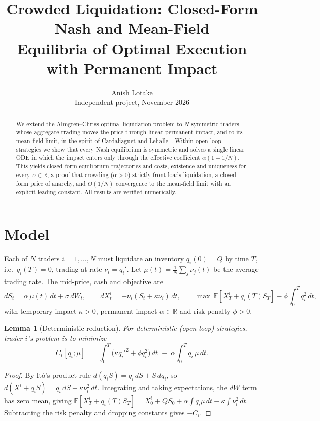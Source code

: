 \documentclass[11pt]{article}
\title{Crowded Liquidation: Closed-Form Nash and Mean-Field\\
Equilibria of Optimal Execution with Permanent Impact}
\author{Anish Lotake\\ \small Independent project, November 2026}
\date{}
\newtheorem{lemma}{Lemma}
\theoremstyle{definition}
\theoremstyle{remark}
\newcommand{\R}{\mathbb{R}}
\newcommand{\E}{\mathbb{E}}
\begin{document}
\maketitle

\begin{abstract}
We extend the Almgren--Chriss optimal liquidation problem to $N$ symmetric traders whose
aggregate trading moves the price through linear permanent impact, and to its mean-field
limit, in the spirit of Cardaliaguet and Lehalle~\cite{CL}. Within open-loop strategies we
show that every Nash equilibrium is symmetric and solves a single linear ODE in which the
impact enters only through the effective coefficient $\alpha(1-1/N)$. This yields closed-form
equilibrium trajectories and costs, existence and uniqueness for every $\alpha\in\R$, a proof
that crowding ($\alpha>0$) strictly front-loads liquidation, a closed-form price of anarchy,
and $O(1/N)$ convergence to the mean-field limit with an explicit leading constant. All
results are verified numerically.
\end{abstract}

\section{Model}
Each of $N$ traders $i=1,\dots,N$ must liquidate an inventory $q_i(0)=Q$ by time $T$,
i.e.\ $q_i(T)=0$, trading at rate $\nu_i = q_i'$. Let $\mu(t)=\frac1N\sum_{j}\nu_j(t)$ be the
average trading rate. The mid-price, cash and objective are
\[
dS_t = \alpha\,\mu(t)\,dt + \sigma\,dW_t,\qquad
dX^i_t = -\nu_i(S_t + \kappa\nu_i)\,dt,\qquad
\max\ \E\!\left[X^i_T + q_i(T)S_T\right] - \phi\int_0^T q_i^2\,dt,
\]
with temporary impact $\kappa>0$, permanent impact $\alpha\in\R$ and risk penalty $\phi>0$.

\begin{lemma}[Deterministic reduction]
For deterministic (open-loop) strategies, trader $i$'s problem is to minimize
\[
C_i[q_i;\mu] \;=\; \int_0^T\!\big(\kappa q_i'^2 + \phi q_i^2\big)\,dt \;-\; \alpha\int_0^T q_i\,\mu\,dt .
\]
\end{lemma}
\begin{proof}
By Itô's product rule $d(q_iS)=q_i\,dS+S\,dq_i$, so
$d(X^i+q_iS) = q_i\,dS - \kappa\nu_i^2\,dt$. Integrating and taking expectations, the
$dW$ term has zero mean, giving
$\E[X^i_T+q_i(T)S_T] = X^i_0+QS_0+\alpha\!\int q_i\mu\,dt-\kappa\!\int\nu_i^2\,dt$.
Subtracting the risk penalty and dropping constants gives $-C_i$.
\end{proof}
\end{document}
